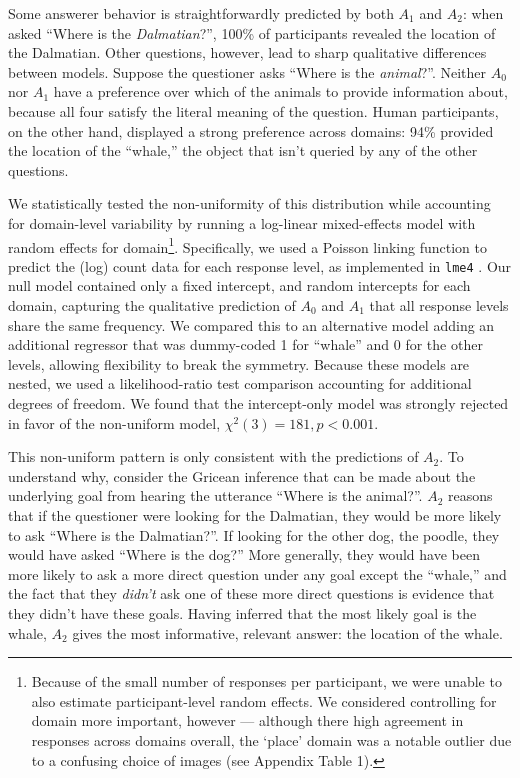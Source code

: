 \documentclass[11pt, floatsintext]{apa6}
\begin{document}
Some answerer behavior is straightforwardly predicted by both $A_1$ and $A_2$: when asked ``Where is the \emph{Dalmatian}?'', 100\% of participants revealed the location of the Dalmatian.
Other questions, however, lead to sharp qualitative differences between models.
Suppose the questioner asks ``Where is the \emph{animal}?''. 
Neither $A_0$ nor $A_1$ have a preference over which of the animals to provide information about, because all four satisfy the literal meaning of the question. 
Human participants, on the other hand, displayed a strong preference across domains: 94\% provided the location of the ``whale,'' the object that isn't queried by any of the other questions.

We statistically tested the non-uniformity of this distribution while accounting for domain-level variability by running a log-linear mixed-effects model with random effects for domain\footnote{Because of the small number of responses per participant, we were unable to also estimate participant-level random effects. We considered controlling for domain more important, however --- although there high agreement in responses across domains overall, the `place' domain was a notable outlier due to a confusing choice of images (see Appendix Table 1).}. 
Specifically, we used a Poisson linking function to predict the (log) count data for each response level, as implemented in \texttt{lme4} \cite{bates2014fitting}.
Our null model contained only a fixed intercept, and random intercepts for each domain, capturing the qualitative prediction of $A_0$ and $A_1$ that all response levels share the same frequency.
We compared this to an alternative model adding an additional regressor that was dummy-coded 1 for ``whale'' and 0 for the other levels, allowing flexibility to break the symmetry.
Because these models are nested, we used a likelihood-ratio test comparison accounting for additional degrees of freedom. 
We found that the intercept-only model was strongly rejected in favor of the non-uniform model, $\chi^2(3) = 181, p < 0.001$.

This non-uniform pattern is only consistent with the predictions of $A_2$. 
To understand why, consider the Gricean inference that can be made about the underlying goal from hearing the utterance ``Where is the animal?''.
$A_2$ reasons that if the questioner were looking for the Dalmatian, they would be more likely to ask ``Where is the Dalmatian?''. 
If looking for the other dog, the poodle, they would have asked ``Where is the dog?''
More generally, they would have been more likely to ask a more direct question under any goal except the ``whale,'' and the fact that they \emph{didn't} ask one of these more direct questions is evidence that they didn't have these goals.
Having inferred that the most likely goal is the whale, $A_2$ gives the most informative, relevant answer: the location of the whale.
\end{document}
